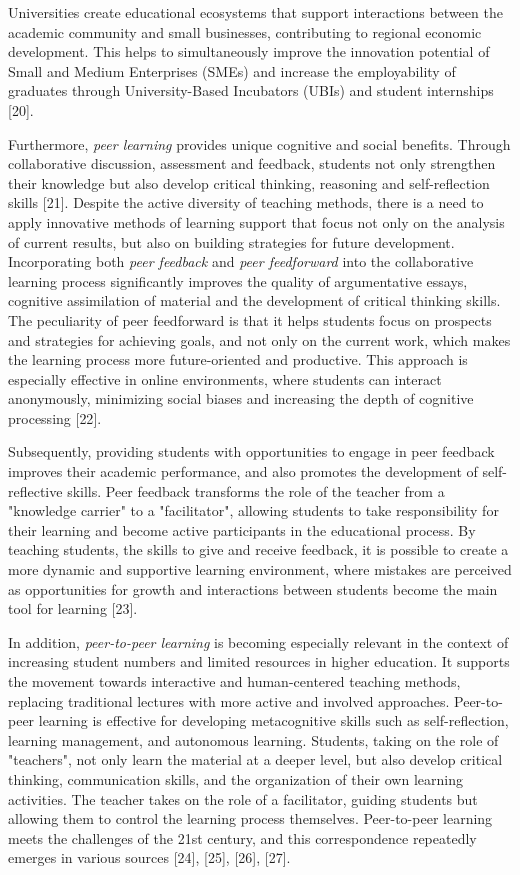 Universities create educational ecosystems that support interactions
between the academic community and small businesses, contributing to
regional economic development. This helps to simultaneously improve the
innovation potential of Small and Medium Enterprises (SMEs) and increase
the employability of graduates through University-Based Incubators
(UBIs) and student internships {[}20{]}.

Furthermore, \emph{peer learning} provides unique cognitive and social
benefits. Through collaborative discussion, assessment and feedback,
students not only strengthen their knowledge but also develop critical
thinking, reasoning and self-reflection skills {[}21{]}. Despite the
active diversity of teaching methods, there is a need to apply
innovative methods of learning support that focus not only on the
analysis of current results, but also on building strategies for future
development. Incorporating both \emph{peer feedback} and \emph{peer
feedforward} into the collaborative learning process significantly
improves the quality of argumentative essays, cognitive assimilation of
material and the development of critical thinking skills. The
peculiarity of peer feedforward is that it helps students focus on
prospects and strategies for achieving goals, and not only on the
current work, which makes the learning process more future-oriented and
productive. This approach is especially effective in online
environments, where students can interact anonymously, minimizing social
biases and increasing the depth of cognitive processing {[}22{]}.

Subsequently, providing students with opportunities to engage in peer
feedback improves their academic performance, and also promotes the
development of self-reflective skills. Peer feedback transforms the role
of the teacher from a "knowledge carrier" to a "facilitator", allowing
students to take responsibility for their learning and become active
participants in the educational process. By teaching students, the
skills to give and receive feedback, it is possible to create a more
dynamic and supportive learning environment, where mistakes are
perceived as opportunities for growth and interactions between students
become the main tool for learning {[}23{]}.

In addition, \emph{peer-to-peer learning} is becoming especially
relevant in the context of increasing student numbers and limited
resources in higher education. It supports the movement towards
interactive and human-centered teaching methods, replacing traditional
lectures with more active and involved approaches. Peer-to-peer learning
is effective for developing metacognitive skills such as
self-reflection, learning management, and autonomous learning. Students,
taking on the role of "teachers", not only learn the material at a
deeper level, but also develop critical thinking, communication skills,
and the organization of their own learning activities. The teacher takes
on the role of a facilitator, guiding students but allowing them to
control the learning process themselves. Peer-to-peer learning meets the
challenges of the 21st century, and this correspondence repeatedly
emerges in various sources {[}24{]}, {[}25{]}, {[}26{]}, {[}27{]}.

